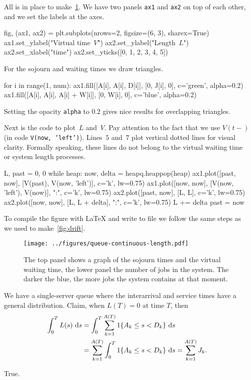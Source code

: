 \documentclass[stochastic-or.tex]{subfiles}
\begin{document}
All is in place to make~\cref{fig:virtual_sojourn}. We have two panels \texttt{ax1} and \texttt{ax2} on top of each other, and we set the labels at the axes.
\begin{python}
fig, (ax1, ax2) = plt.subplots(nrows=2, figsize=(6, 3), sharex=True)
ax1.set_ylabel("Virtual time~$V$")
ax2.set_ylabel("Length~$L$")
ax2.set_xlabel("time")
ax2.set_yticks([0, 1, 2, 3, 4, 5])
\end{python}

For the sojourn and waiting times we draw triangles.
\begin{python}
for i in range(1, num):
    ax1.fill([A[i], A[i], D[i]], [0, J[i], 0], c='green', alpha=0.2)
    ax1.fill([A[i], A[i], A[i] + W[i]], [0, W[i], 0], c='blue', alpha=0.2)
\end{python}
Setting the opacity \texttt{alpha} to $0.2$  gives nice  results for overlapping triangles.


Next is the code to plot~$L$ and~$V$. Pay attention to the fact that we use $V(t-)$ (in code \texttt{V(now, 'left')}). Lines~$5$ and~$7$ plot vertical dotted lines for visual clarity. Formally speaking, these lines do not belong to the virtual waiting time or system length processes.
\begin{python}
L, past = 0, 0
while heap:
    now, delta = heapq.heappop(heap)
    ax1.plot([past, now], [V(past), V(now, 'left')], c='k', lw=0.75)
    ax1.plot([now, now], [V(now, 'left'), V(now)], ":", c='k', lw=0.75)
    ax2.plot([past, now], [L, L], c='k', lw=0.75)
    ax2.plot([now, now], [L, L + delta], ":", c='k', lw=0.75)
    L += delta
    past = now
\end{python}
To compile the figure with \LaTeX\/ and write to file we follow the same steps as we used to make~\cref{fig:drift}.



\begin{figure}[t]
\centering
\texttt{[image: ../figures/queue-continuous-length.pdf]}
\caption{The top panel shows a graph of the sojourn times and the virtual waiting time, the lower panel the  number of jobs in the system. The darker the blue, the more jobs the system contains at that moment.}
\label{fig:virtual_sojourn}
\end{figure}

\begin{truefalse}
We have a single-server queue where the interarrival and service times have a general distribution. Claim, when $L(T)=0$ at time $T$, then
\begin{equation*}
 \begin{split}
 \int_0^T L(s)\, \,\textrm{d}s & = \int_0^T \sum_{k=1}^{A(T)} 1\{A_k \leq s < D_k\} \, \,\textrm{d}s \\
& = \sum_{k=1}^{A(T)}\int_0^T 1\{A_k \leq s < D_k\} \, \,\textrm{d}s = \sum_{k=1}^{A(T)} J_k.
 \end{split}
\end{equation*}
\begin{solution}
True.
\end{solution}
\end{truefalse}
\end{document}
